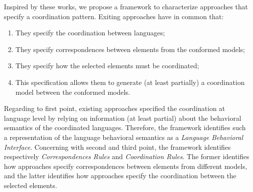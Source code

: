 Inspired by these works, we propose a framework to characterize approaches that specify a coordination pattern. Exiting approaches have in common that:
\begin{enumerate}
	\item They specify the coordination between languages;
	
	\item They specify correspondences between elements from the conformed models;
	
	\item They specify how the selected elements must be coordinated;
	
	\item This specification allows them to generate (at least partially) a coordination model between the conformed models.    
\end{enumerate}	
Regarding to first point, existing approaches specified the coordination at language level by relying on information (at least partial) about the behavioral semantics of the coordinated languages. Therefore, the framework identifies such a representation of the language behavioral semantics as a \emph{Language Behavioral Interface}. Concerning with second and third point, the framework identifies respectively \emph{Correspondences Rules} and \emph{Coordination Rules}. The former identifies how approaches specify correspondences between elements from different models, and the latter identifies how approaches specify the coordination between the selected elements.


